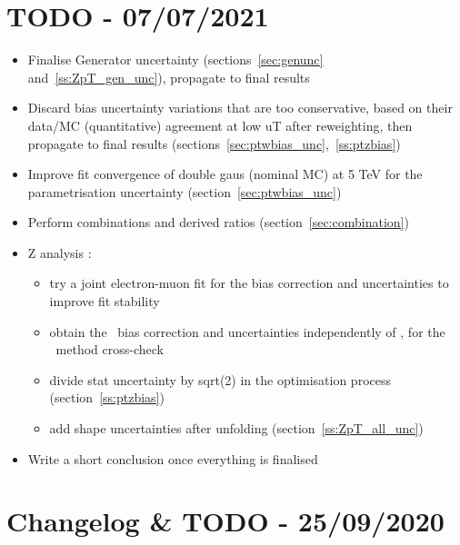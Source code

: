 
\clearpage

\section*{TODO - 07/07/2021}

\begin{itemize}
  \item Finalise Generator uncertainty (sections~\ref{sec:genunc} and~\ref{ss:ZpT_gen_unc}), propagate to final results
  \item Discard bias uncertainty variations that are too conservative, based on their data/MC (quantitative) agreement at low uT after reweighting, then propagate to final results (sections~\ref{sec:ptwbias_unc},~\ref{ss:ptzbias})
  \item Improve fit convergence of double gaus (nominal MC) at 5 TeV for the parametrisation uncertainty (section~\ref{sec:ptwbias_unc})
  \item Perform combinations and derived ratios (section~\ref{sec:combination})
  \item Z analysis :
  \begin{itemize}
   \item try a joint electron-muon fit for the bias correction and uncertainties to improve fit stability
   \item obtain the \ut\ bias correction and uncertainties independently of \ptll, for the \Wboson\ method cross-check
   \item divide stat uncertainty by sqrt(2) in the optimisation process (section~\ref{ss:ptzbias})
   \item add shape uncertainties after unfolding (section~\ref{ss:ZpT_all_unc})
  \end{itemize}
  \item Write a short conclusion once everything is finalised
\end{itemize}



\section*{Changelog \& {\color{red} TODO} - 25/09/2020}

